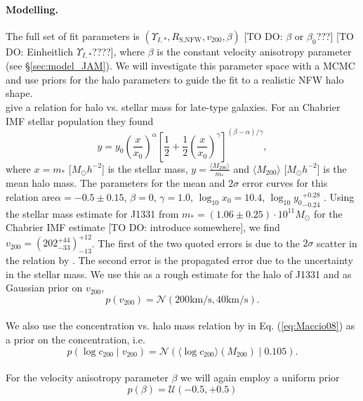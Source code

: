 \paragraph{Modelling.} The full set of fit parameters is $(\Upsilon_{I,*},R_\text{S,NFW},v_{200},\beta)$ [TO DO: $\beta$ or $\beta_0$???] [TO DO: Einheitlich $\Upsilon_{I,*}$????], where $\beta$ is the constant velocity anisotropy parameter (see \S\ref{sec:model_JAM}). We will investigate this parameter space with a MCMC \citep{emcee} and use priors for the halo parameters to guide the fit to a realistic NFW halo shape.
\\\citet{Dutton10} give a relation for halo vs. stellar mass for late-type galaxies. For an Chabrier IMF stellar population they found
\begin{equation*}
y = y_0 \left( \frac{x}{x_0} \right)^\alpha \left[ \frac 12 + \frac 12 \left(\frac{x}{x_0} \right)^\gamma \right]^{(\beta - \alpha)/\gamma},
\end{equation*}
where $x= m_*$ [$M_\odot h^{-2}$] is the stellar mass, $y = \frac{\langle M_{200}\rangle}{m_*}$ and $\langle M_{200}\rangle$ [$M_\odot h^{-2}$] is the mean halo mass. The parameters for the mean and $2\sigma$ error curves for this relation are$\alpha = -0.5\pm0.15$, $\beta = 0$, $\gamma = 1.0$, $\log_{10} x_0 = 10.4$, $\log_{10} {y_0}_{-0.24}^{+0.28}$ \citet{Dutton10}. Using the stellar mass estimate for J1331 from \citet{SWELLSI} $m_* = (1.06 \pm 0.25) \cdot 10^{11} M_\odot$ for the Chabrier IMF estimate [TO DO: introduce somewhere], we find ${v_{200}} = (202_{-33}^{+44})_{-13}^{+12}$. The first of the two quoted errors is due to the $2\sigma$ scatter in the relation by \citet{Dutton10}. The second error is the propagated error due to the uncertainty in the stellar mass. We use this as a rough estimate for the halo of J1331 and as Gaussian prior on $v_{200}$, 
\begin{equation*}
p(v_{200}) = \mathscr{N}(200 \text{km/s} ,40 \text{km/s}).
\end{equation*}
\\We also use the concentration vs. halo mass relation by \citet{Maccio08} in Eq. (\ref{eq:Maccio08}) as a prior on the concentration, i.e.
\begin{equation*}
p(\log c_{200} \mid v_{200}) = \mathscr{N}\left(\langle \log c_{200} \rangle (M_{200}) \mid 0.105 \right).
\end{equation*}
\\For the velocity anisotropy parameter $\beta$ we will again employ a uniform prior 
\begin{equation*}
p(\beta) = \mathscr{U}(-0.5,+0.5)
\end{equation*}

